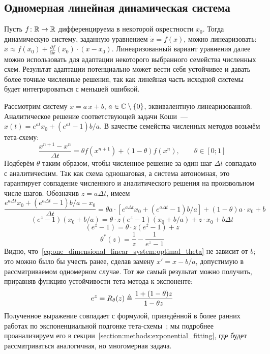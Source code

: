 \subsection{Одномерная линейная динамическая система}
\label{subsection:methods:one_dimensional_linear_system}

Пусть $ f \colon \mathbb{R} \to \mathbb{R} $ дифференцируема в некоторой окрестности $ x_0 $.
Тогда динамическую систему, заданную уравнением $ \dot x = f(x) $,
можно линеаризовать: $ \dot x \approx f(x_0) + \frac{\partial f}{\partial x}(x_0) \cdot (x - x_0) $.
Линеаризованный вариант уравнения далее можно использовать для адаптации некоторого выбранного семейства численных схем.
Результат адаптации потенциально может вести себя устойчивее и давать более точные численные решения,
так как линейная часть исходной системы будет интегрироваться с меньшей ошибкой.

Рассмотрим систему $ \dot x = a \, x + b $, $ a \in \mathbb{C} \setminus \{ 0 \} $,
эквивалентную линеаризованной.
Аналитическое решение соответствующей задачи Коши~--- $ x(t) = e^{a t} x_0 + (e^{a t} - 1) b / a $.
В качестве семейства численных методов возьмём тета-схему:
%
\begin{equation}
    \label{eq:one_dimensional_linear_system:one_dimensional_theta-method}
    \frac{x^{n+1} - x^n}{\Delta t} = \theta f(x^{n+1}) + (1 - \theta) f(x^n), \qquad \theta \in [0;1]
\end{equation}
%
Подберём $ \theta $ таким образом,
чтобы численное решение за один шаг $ \Delta t $ совпадало с аналитическим.
Так как схема одношаговая, а система автономная,
это гарантирует совпадение численного и аналитического решения на произвольном числе шагов.
Обозначив $ z = a \Delta t $, имеем
\[
    \frac{e^{a \Delta t} x_0 + (e^{a \Delta t} - 1) b / a - x_0}{\Delta t} = \theta a \cdot \left[ e^{a \Delta t} x_0 + (e^{a \Delta t} - 1) b / a \right] + (1 - \theta) a \cdot x_0 + b
\]
\[
    (e^{z} - 1)(x_0 + b / a) = \theta \cdot z (e^{z} - 1)(x_0 + b / a) + z \cdot x_0 + b \Delta t
\]
\[
    (e^{z} - 1) = \theta \cdot z (e^{z} - 1) + z
\]
\begin{equation}
    \label{eq:one_dimensional_linear_system:optimal_theta}
    \theta^*(z) = \frac{1}{z} - \frac{1}{e^{z} - 1}
\end{equation}
%
Видно, что~\eqref{eq:one_dimensional_linear_system:optimal_theta} не зависит от $ b $;
это можно было бы учесть ранее, сделав замену $ x' = x - b/a $,
допустимую в рассматриваемом одномерном случае.
Тот же самый результат можно получить, приравняв функцию устойчивости тета-метода к экспоненте:
\[
    e^z = R_\theta(z) \triangleq \frac{1 + (1 - \theta) z}{1 - \theta z}
\]
Полученное выражение совпадает с формулой, приведённой в более ранних работах по
экспоненциальной подгонке тета-схемы~\cite{liniger1970efficient_integration_methods, lambert1991methods, berzins1992adaptive_theta_method};
мы подробнее проанализируем его в секции~\ref{section:methods:exponential_fitting},
где будет рассматриваться аналогичная,
но многомерная задача.


